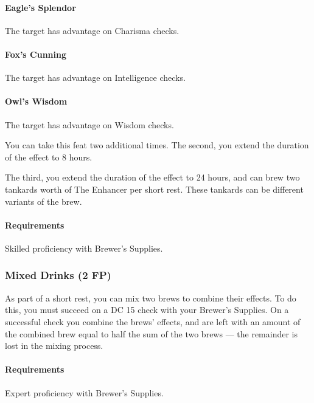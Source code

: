     \paragraph{Eagle's Splendor} The target has advantage on Charisma checks.
    \paragraph{Fox's Cunning} The target has advantage on Intelligence checks.
    \paragraph{Owl's Wisdom} The target has advantage on Wisdom checks.

    You can take this feat two additional times.
    The second, you extend the duration of the effect to 8 hours.

    The third, you extend the duration of the effect to 24 hours, and can brew two tankards worth of The Enhancer per short rest.
    These tankards can be different variants of the brew.
    \paragraph{Requirements} Skilled proficiency with Brewer's Supplies.
\subsubsection{Mixed Drinks (2 FP)} \label{feat::mixeddrinks}
    As part of a short rest, you can mix two brews to combine their effects.
    To do this, you must succeed on a DC 15 check with your Brewer's Supplies.
    On a successful check you combine the brews' effects, and are left with an amount of the combined brew equal to half the sum of the two brews --- the remainder is lost in the mixing process.
    \paragraph{Requirements} Expert proficiency with Brewer's Supplies.

